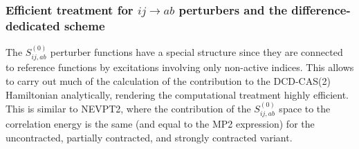\subsubsection{Efficient treatment for $ij\rightarrow ab$ perturbers and the difference-dedicated scheme}
\label{Sec:Efficient_ijab}
The $S_{ij,ab}^{(0)}$ perturber functions have a special structure since they are connected to reference functions by excitations involving only non-active indices. This allows to carry out much of the calculation of the contribution to the DCD-CAS(2) Hamiltonian analytically, rendering the computational treatment highly efficient. This is similar to NEVPT2, where the contribution of the $S_{ij,ab}^{(0)}$ space to the correlation energy is the same (and equal to the MP2 expression) for the uncontracted, partially contracted, and strongly contracted variant.

